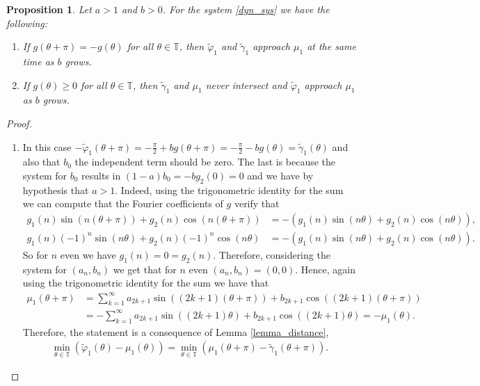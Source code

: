 \documentclass[12pt]{article}
\newcommand{\T}{\mathbb{T}}
\theoremstyle{plain}
\newtheorem{prop}[defn]{Proposition}
\theoremstyle{remark}
\theoremstyle{definition}
\begin{document}
\begin{prop}\label{g_cases}
    Let $a>1$ and $b>0$. For the system \eqref{dyn_sys} we have the following:
    \begin{enumerate}
        \item If $g(\theta+\pi)=-g(\theta)$ for all $\theta\in\T$, then $\tilde\varphi_1$ and $\tilde\gamma_1$ approach $\mu_1$ at the same time as $b$ grows.
        \item If $g(\theta)\geq0$ for all $\theta\in\T$, then $\tilde\gamma_1$ and $\mu_1$ never intersect and $\tilde\varphi_1$ approach $\mu_1$ as $b$ grows.
    \end{enumerate}
\end{prop}
\begin{proof}
    \begin{enumerate}
        \item In this case $-\tilde\varphi_1(\theta+\pi) = -\frac{\pi}{2} + b g(\theta+\pi) = -\frac{\pi}{2} - b g(\theta) = \tilde\gamma_1(\theta)$ and also that $b_0$ the independent term should be zero. The last is because the system for $b_0$ results in $(1-a)b_0 = -b g_2(0) = 0$ and we have by hypothesis that $a>1$. Indeed, using the trigonometric identity for the sum we can compute that the Fourier coefficients of $g$ verify that
        \begin{align*}
            g_1(n)\sin(n(\theta+\pi))+g_2(n)\cos(n(\theta+\pi)) &= -\left( g_1(n)\sin(n\theta)+g_2(n)\cos(n\theta)\right),\\
            g_1(n)(-1)^n\sin(n\theta)+g_2(n)(-1)^n\cos(n\theta) &= -\left( g_1(n)\sin(n\theta)+g_2(n)\cos(n\theta)\right).
        \end{align*}
        So for $n$ even we have $g_1(n)=0=g_2(n)$. Therefore, considering the system for $(a_n,b_n)$ we get that for $n$ even $(a_n,b_n)=(0,0)$.
        Hence, again using the trigonometric identity for the sum we have that
        \begin{align*}
            \mu_1(\theta+\pi)&=\sum_{k=1}^\infty a_{2k+1}\sin((2k+1)(\theta+\pi))+b_{2k+1}\cos((2k+1)(\theta+\pi))\\
            &= -\sum_{k=1}^\infty a_{2k+1}\sin((2k+1)\theta)+b_{2k+1}\cos((2k+1)\theta) = -\mu_1(\theta).
        \end{align*}
        Therefore, the statement is a consequence of Lemma \eqref{lemma_distance},
            \begin{align}\label{symmetriccase_1_2}
                \min_{\theta\in\T}\left(\tilde\varphi_1(\theta)-\mu_1(\theta)\right)
                 = \min_{\theta\in\T}\left(\mu_1(\theta+\pi)-\tilde\gamma_1(\theta+\pi)\right).
            \end{align}


\end{enumerate}
\end{proof}
\end{document}
